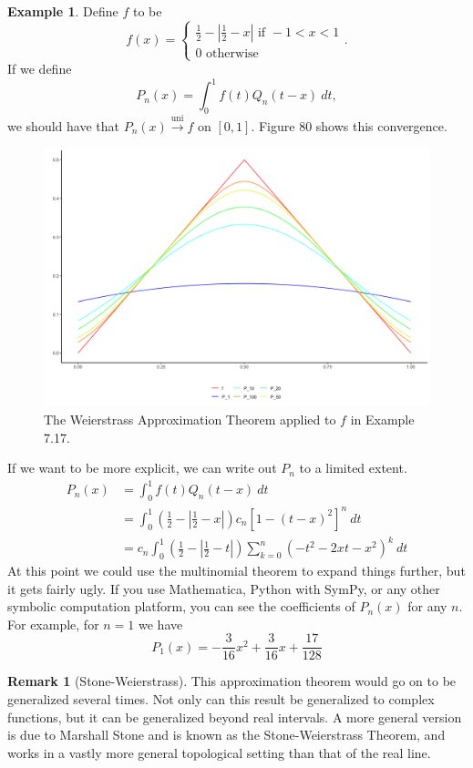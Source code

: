 \documentclass{article}
\newcommand{\uni}{\overset{\text{uni}}{\to}}
\theoremstyle{definition}
\newtheorem{example}{Example}[section]
\newtheorem{remark}{Remark}[section]
\begin{document}
\begin{example}
	Define $ f $ to be $$f(x)=\begin{cases}
	\frac{1}{2}-\left\lvert \frac{1}{2}-x\right\rvert \text{ if } -1 <x<1\\
	0\text{ otherwise}
	\end{cases}. $$ If we define $$ P_n(x)=\int_{0}^{1}f(t)Q_n(t-x)\ dt, $$ we should have that $ P_n(x)\uni f $ on $ [0,1] $. Figure 80 shows this convergence. 
\begin{figure}[h!]
	\centering
	\includegraphics[width=0.9\linewidth]{figures/SW_approx}
	\caption{The Weierstrass Approximation Theorem applied to $ f $ in Example 7.17.}
	\label{fig:swapprox}
\end{figure}
If we want to be more explicit, we can write out $ P_n $ to a limited extent.
\begin{align*}
	P_n(x)&=\int_{0}^{1}f(t)Q_n(t-x)\ dt\\&=\int_{0}^{1}\left(\frac{1}{2}-\left\lvert \frac{1}{2}-x\right\rvert\right) c_n[1-(t-x)^2]^n\ dt\\
	&=c_n\int_{0}^{1}\left(\frac{1}{2}-\left\lvert \frac{1}{2}-t\right\rvert\right)\sum_{k=0}^{n}(-t^2-2xt-x^2)^k\ dt
\end{align*}
At this point we could use the multinomial theorem to expand things further, but it gets fairly ugly. If you use Mathematica, Python with SymPy, or any other symbolic computation platform,  you can see the coefficients of $ P_n(x) $ for any $ n $. For example, for $ n=1 $ we have $$ P_1(x)=-\frac{3}{16}x^2 + \frac{3}{16}x + \frac{17}{128}$$
\end{example}
\begin{remark}[Stone-Weierstrass]
This approximation theorem would go on to be generalized several times. Not only can this result be generalized to complex functions, but it can be generalized beyond real intervals. A more general version is due to Marshall Stone and is known as the Stone-Weierstrass Theorem, and works in a vastly more general topological setting than that of the real line. 

\end{remark}
\end{document}
